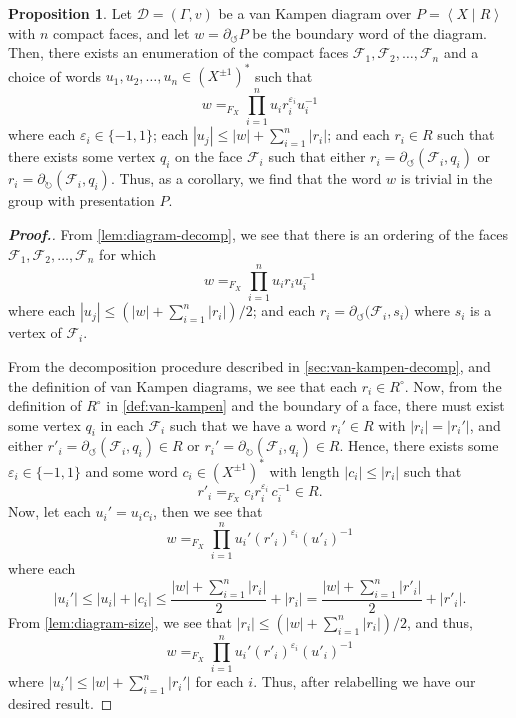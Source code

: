 \documentclass[11pt,a4paper,reqno]{amsart}
\theoremstyle{plain}
\theoremstyle{definition}
\newtheorem{proposition}[theorem]{Proposition}
\theoremstyle{definition}
\renewcommand\leq\leqslant
\newenvironment{myproof}{\begin{proof}[\normalfont\bfseries Proof.]}{\end{proof}}
\begin{document}
\begin{proposition}\label{prop:van-kampen-decomp}
	Let $\mathcal D = (\Gamma, v)$ be a van Kampen diagram over $P = \left\langle X\mid R\right\rangle$ with $n$ compact faces, and let $w = \partial_\circlearrowleft P$ be the boundary word of the diagram.
  Then, there exists an enumeration of the compact faces $\mathcal F_1, \mathcal F_2,\ldots, \mathcal F_n$ and a choice of words $u_1,u_2,\ldots,u_n\in (X^{\pm 1})^*$ such that
	\[
		w
		=_{F_X}
		\prod_{i=1}^{n}
    u_i r_i^{\varepsilon_i} u_{i}^{-1}
	\]
  where
    each $\varepsilon_i\in \{-1,1\}$;
     each $|u_j|\leq |w|+\sum_{i=1}^n |r_i|$;
     and each $r_i \in R$ such that there exists some vertex $q_i$ on the face $\mathcal F_i$ such that either $r_i =\partial_\circlearrowleft (\mathcal F_i, q_i)$ or $r_i =\partial_\circlearrowright (\mathcal F_i, q_i)$.
  Thus, as a corollary, we find that the word $w$ is trivial in the group with presentation $P$.
\end{proposition}

\begin{myproof}
  From \cref{lem:diagram-decomp}, we see that there is an ordering of the faces $\mathcal F_1, \mathcal F_2,\ldots,\mathcal F_n$ for which
	\[
		w
		=_{F_X}
		\prod_{i=1}^{n}
    u_i r_i u_{i}^{-1}
	\]
  where
     each $|u_j|\leq (|w|+\sum_{i=1}^n |r_i|)/2$;
     and each $r_i  = \partial_{\circlearrowleft} \mathcal (\mathcal F_i,s_i)$ where $s_i$ is a vertex of $\mathcal F_i$.

    From the decomposition procedure described in \cref{sec:van-kampen-decomp}, and the definition of van Kampen diagrams, we see that each $r_i \in R^\circ$.
  Now, from the definition of $R^\circ$ in \cref{def:van-kampen} and the boundary of a face, there must exist some vertex $q_i$ in each $\mathcal F_i$ such that we have a word $r_i'\in R$ with $|r_i|=|r_i'|$, and either $r'_i = \partial_\circlearrowleft (\mathcal F_i, q_i)\in R$ or $r_i' = \partial_\circlearrowright (\mathcal F_i, q_i)\in R$.
  Hence, there exists some $\varepsilon_i \in \{-1,1\}$ and some word $c_i \in (X^{\pm 1})^*$ with length $|c_i|\leq |r_i|$ such that
  \[
    r'_i =_{F_X} c_i r_i^{\varepsilon_i}\, c_i^{-1} \in R.
  \]
  Now, let each $u_i' = u_i c_i$, then we see that
  \[
    w
		=_{F_X}
		\prod_{i=1}^{n}
    u_i' (r'_i)^{\varepsilon_i} (u'_{i})^{-1}
  \]
  where each
  \[
    |u_i'|\leq |u_i|+|c_i| \leq \frac{|w|+\sum_{i=1}^n |r_i|}{2} + |r_i|
    =
    \frac{|w|+\sum_{i=1}^n |r'_i|}{2} + |r'_i|
    .
  \]
  From \cref{lem:diagram-size}, we see that $|r_i|\leq (|w|+\sum_{i=1}^n |r_i|)/2$, and thus,
  \[
    w
		=_{F_X}
		\prod_{i=1}^{n}
    u_i' (r'_i)^{\varepsilon_i} (u'_{i})^{-1}
  \]
  where $|u_i'| \leq |w|+\sum_{i=1}^n |r_i'|$ for each $i$.
  Thus, after relabelling we have our desired result.
\end{myproof}
\end{document}
